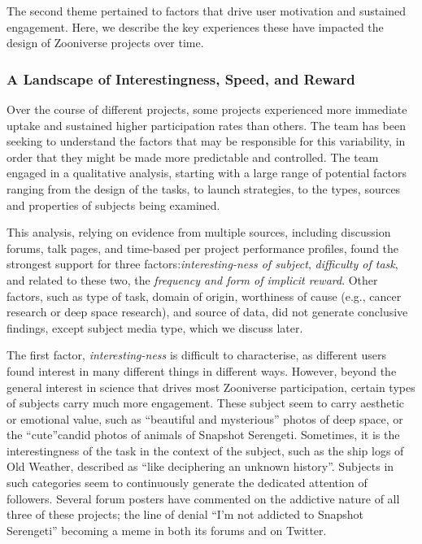 \documentclass{sigchi}
\begin{document}
The second theme pertained to factors that drive user motivation and sustained engagement. Here, we describe the key experiences these have impacted the design of Zooniverse projects over time.

\subsubsection{A Landscape of Interestingness, Speed, and Reward} 
Over the course of different projects, some projects experienced more immediate uptake and sustained higher participation rates than others.  The team has been seeking to understand the factors that may be responsible for this variability, in order that they might be made more predictable and controlled.  The team engaged in a qualitative analysis, starting with a large range of potential factors ranging from the design of the tasks, to launch strategies, to the types, sources and properties of subjects being examined. 

This analysis, relying on evidence from multiple sources, including discussion forums, talk pages, and time-based per project performance profiles, found the strongest support for three factors:\emph{interesting-ness of subject}, \emph{difficulty of task}, and related to these two, the \emph{frequency and form of implicit reward}. Other factors, such as type of task, domain of origin, worthiness of cause (e.g., cancer research or deep space research), and source of data, did not generate conclusive findings, except subject media type, which we discuss later.

The first factor, \emph{interesting-ness} is difficult to characterise, as different users found interest in many different things in different ways.  However, beyond the general interest in science that drives most Zooniverse participation, certain types of subjects carry much more engagement.  These subject seem to carry aesthetic or emotional value, such as ``beautiful and mysterious'' photos of deep space, or the ``cute''candid photos of animals of Snapshot Serengeti.  Sometimes, it is the interestingness of the task in the context of the subject, such as the ship logs of Old Weather, described as ``like deciphering an unknown history''.  Subjects in such categories seem to continuously generate the dedicated attention of followers.  Several forum posters have commented on the addictive nature of all three of these projects; the line of denial ``I'm not addicted to Snapshot Serengeti'' becoming a meme in both its forums and on Twitter.
\end{document}
